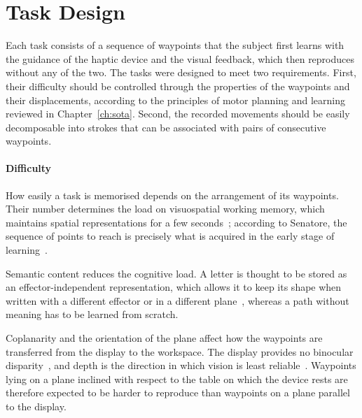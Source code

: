 \documentclass[12pt]{report}
\begin{document}
\section{Task Design}
\label{sec:task_design}
Each task consists of a sequence of waypoints that the subject first learns with the guidance of the haptic device and the visual feedback, which then reproduces without any of the two. The tasks were designed to meet two requirements. First, their difficulty should be controlled through the properties of the waypoints and their displacements, according to the principles of motor planning and learning reviewed in Chapter~\ref{ch:sota}. Second, the recorded movements should be easily decomposable into strokes that can be associated with pairs of consecutive waypoints.

\paragraph{Difficulty}
How easily a task is memorised depends on the arrangement of its waypoints. Their number determines the load on visuospatial working memory, which maintains spatial representations for a few seconds~\cite[p.~1292]{shohamy2021}; according to Senatore, the sequence of points to reach is precisely what is acquired in the early stage of learning~\cite[pp.~34--38]{senatore2012}. 

Semantic content reduces the cognitive load. A letter is thought to be stored as an effector-independent representation, which allows it to keep its shape when written with a different effector or in a different plane~\cites[pp.~726--727]{wolpert2021}[p.~38]{senatore2012}, whereas a path without meaning has to be learned from scratch. 

Coplanarity and the orientation of the plane affect how the waypoints are transferred from the display to the workspace. The display provides no binocular disparity~\cite[pp.~550--552]{gilbert2021}, and depth is the direction in which vision is least reliable~\cite[p.~720]{wolpert2021}. Waypoints lying on a plane inclined with respect to the table on which the device rests are therefore expected to be harder to reproduce than waypoints on a plane parallel to the display.
\end{document}
